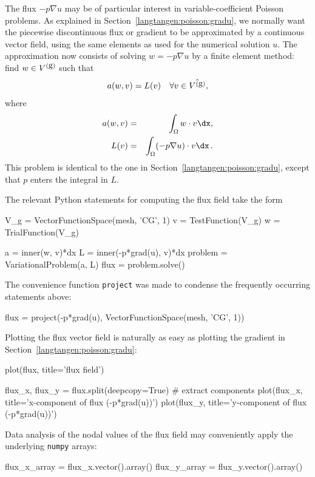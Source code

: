 The flux $-p\nabla u$ may be of particular interest in variable-coefficient
Poisson
problems. As explained in Section~\ref{langtangen:poisson:gradu},
we normally want the piecewise discontinuous flux or gradient
to be approximated by a continuous vector field, using the same elements
as used for the numerical solution $u$. The approximation now consists of
solving $w = -p\nabla u$ by a finite element method:
find $w\in V^{(\mbox{g})}$ such that
\begin{equation}
a(w, v) = L(v)\quad\forall v\in \hat{V^{(\mbox{g})}},
\end{equation}
where
\begin{eqnarray}
a(w, v) &=& \int_\Omega w\cdot v\dx,\\
L(v) &=& \int_\Omega (-p \nabla u)\cdot v\dx\langtangenep
\end{eqnarray}
This problem is identical to the one in Section~\ref{langtangen:poisson:gradu},
except that $p$ enters the integral in $L$.

The relevant Python statements for computing the flux field take the form
\begin{python}
V_g = VectorFunctionSpace(mesh, 'CG', 1)
v = TestFunction(V_g)
w = TrialFunction(V_g)

a = inner(w, v)*dx
L = inner(-p*grad(u), v)*dx
problem = VariationalProblem(a, L)
flux = problem.solve()
\end{python}
The convenience function {\fontsize{10pt}{10pt}\texttt{project}} was made to condense the frequently
occurring statements above:
\begin{python}
flux = project(-p*grad(u), 
               VectorFunctionSpace(mesh, 'CG', 1))
\end{python}

Plotting the flux vector field is naturally as easy as plotting
the gradient in Section~\ref{langtangen:poisson:gradu}:
\begin{python}
plot(flux, title='flux field')

flux_x, flux_y = flux.split(deepcopy=True)  # extract components
plot(flux_x, title='x-component of flux (-p*grad(u))')
plot(flux_y, title='y-component of flux (-p*grad(u))')
\end{python}

Data analysis of the nodal values of the flux field may conveniently
apply the underlying {\fontsize{10pt}{10pt}\texttt{numpy}} arrays:
\begin{python}
flux_x_array = flux_x.vector().array()
flux_y_array = flux_y.vector().array()
\end{python}

